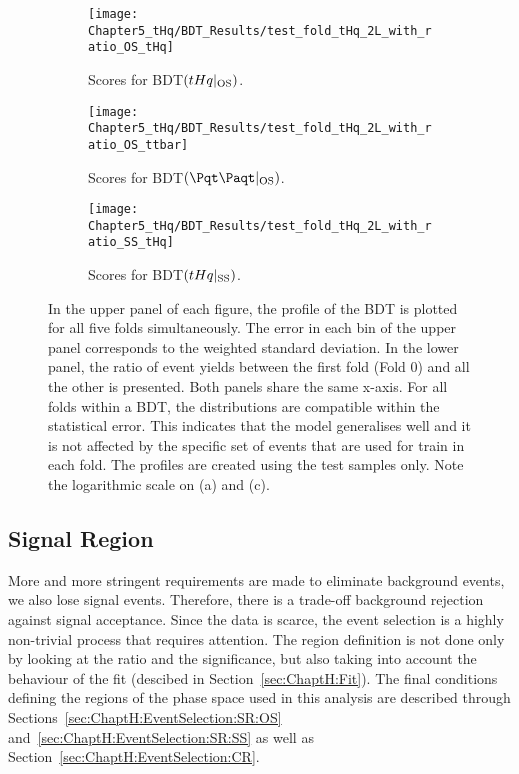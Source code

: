 \begin{figure}[h]
  \centering  
  \begin{subfigure}[b]{0.31\textwidth}
    \centering
    \texttt{[image: Chapter5\_tHq/BDT\_Results/test\_fold\_tHq\_2L\_with\_ratio\_OS\_tHq]}
    \caption{Scores for BDT$(tHq|_{\text{OS}})$.}
     \label{fig:ChaptH:EventSelection:BDT:OS_ScoresCombo:tHq}
  \end{subfigure}
  \hfill
  \begin{subfigure}[b]{0.31\textwidth}
    \centering
    \texttt{[image: Chapter5\_tHq/BDT\_Results/test\_fold\_tHq\_2L\_with\_ratio\_OS\_ttbar]}
    \caption{Scores for BDT$(\ttbar|_{\text{OS}})$.}
     \label{fig:ChaptH:EventSelection:BDT:OS_ScoresCombo_ttbar}
  \end{subfigure}
    \hfill
  \begin{subfigure}[b]{0.31\textwidth}
    \centering
    \texttt{[image: Chapter5\_tHq/BDT\_Results/test\_fold\_tHq\_2L\_with\_ratio\_SS\_tHq]}
    \caption{Scores for BDT$(tHq|_{\text{SS}})$.}
     \label{fig:ChaptH:EventSelection:BDT:SS_ScoresCombo_tHq}
  \end{subfigure}
  \caption{In the upper panel of each figure, the profile of the BDT is plotted for all 
  		five folds simultaneously. The error in each bin of the upper panel corresponds
		to the weighted %
		standard deviation. In the lower panel, the ratio of event yields between the first fold (Fold 0) and
		all the other is presented.
		Both panels share the same x-axis.
  		For all folds within a BDT, the distributions are compatible within the statistical error. 
		This indicates that the model generalises well and it is not affected by the specific set 
		of events that are used for train in each fold.
		The profiles are created using the test samples only. 
  		Note the logarithmic scale on (a) and (c).}
  \label{fig:ChaptH:EventSelection:BDT:OS_ScoresCombo}
\end{figure}




\FloatBarrier
\subsection{Signal Region}
\label{sec:ChaptH:EventSelection:SR}
More and more stringent requirements are made to eliminate background events, we also 
lose signal events. Therefore, there is a trade-off background rejection against signal acceptance. 
Since the \tHq data is scarce, the event selection
is a highly non-trivial process that requires attention. 
The region definition is not done only by looking at the \StoB ratio
and the significance, but also taking into account the behaviour of the fit (descibed
in Section~\ref{sec:ChaptH:Fit}). 
The final conditions defining the regions of the phase space used in this analysis
are described through Sections~\ref{sec:ChaptH:EventSelection:SR:OS}
and~\ref{sec:ChaptH:EventSelection:SR:SS} as well as Section~\ref{sec:ChaptH:EventSelection:CR}.


